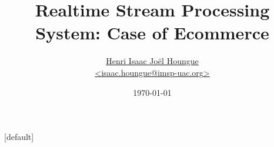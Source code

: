 \title{
    \sc 
    Realtime Stream Processing System: Case of Ecommerce
}
[default]
\date{\sc \small \vspace{3em} \today} 
\author{\href{mailto:isaac.houngue@imsp-uac.org}{\small Henri Isaac Joël Houngue \\ {\sc <}isaac.houngue@imsp-uac.org{\sc >}}}%
